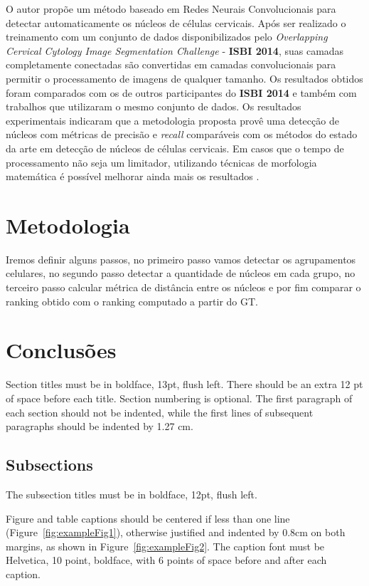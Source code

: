 \documentclass[12pt]{article}
\begin{document}
O autor propõe um método baseado em Redes Neurais Convolucionais para detectar automaticamente os núcleos de células cervicais. Após ser realizado o treinamento com um conjunto de dados disponibilizados pelo \textit{Overlapping Cervical Cytology Image Segmentation Challenge} - \textbf{ISBI 2014}, suas camadas completamente conectadas são convertidas em camadas convolucionais para permitir o processamento de imagens de qualquer tamanho. Os resultados obtidos foram comparados com os de outros participantes do \textbf{ISBI 2014} e também com trabalhos que utilizaram o mesmo conjunto de dados. Os resultados experimentais indicaram que a metodologia proposta provê uma detecção de núcleos com métricas de precisão e \textit{recall} comparáveis com os métodos do estado da arte em detecção de núcleos de células cervicais. Em casos que o tempo de processamento não seja um limitador, utilizando técnicas de morfologia matemática é possível melhorar ainda mais os resultados \cite{braz2018detecccao}.


\section{Metodologia}

Iremos definir alguns passos, no primeiro passo vamos detectar os agrupamentos celulares, no segundo passo detectar a quantidade de núcleos em cada grupo, no terceiro passo calcular métrica de distância entre os núcleos e por fim comparar o ranking obtido com o ranking computado a partir do GT.

\section{Conclusões}

Section titles must be in boldface, 13pt, flush left. There should be an extra
12 pt of space before each title. Section numbering is optional. The first
paragraph of each section should not be indented, while the first lines of
subsequent paragraphs should be indented by 1.27 cm.

\subsection{Subsections}

The subsection titles must be in boldface, 12pt, flush left.



Figure and table captions should be centered if less than one line
(Figure~\ref{fig:exampleFig1}), otherwise justified and indented by 0.8cm on
both margins, as shown in Figure~\ref{fig:exampleFig2}. The caption font must
be Helvetica, 10 point, boldface, with 6 points of space before and after each
caption.
\end{document}
